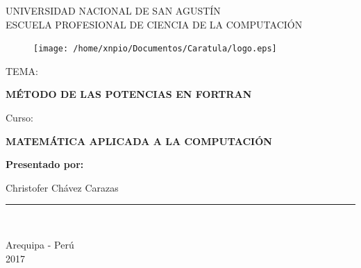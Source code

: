 \documentclass[a4paper,12pt]{article}
\begin{document}
\begin{titlepage}

\begin{center}
\vspace*{-1in}

\begin{large}
UNIVERSIDAD NACIONAL DE SAN AGUSTÍN\\
\vspace*{0.15in}
ESCUELA PROFESIONAL DE CIENCIA DE LA COMPUTACIÓN\\
\end{large}
\begin{figure}[htb]
\centering
\texttt{[image: /home/xnpio/Documentos/Caratula/logo.eps]}
\end{figure}
\vspace*{0.15in}
\begin{large}
TEMA:\\
\end{large}
\vspace*{0.2in}
\begin{Large}
\textbf{MÉTODO DE LAS POTENCIAS EN FORTRAN} \\
\end{Large}
\vspace{8mm}

\begin{large}
Curso:\\
\end{large}
\vspace*{0.2in}
\begin{Large}
\textbf{MATEMÁTICA APLICADA A LA COMPUTACIÓN} \\
\end{Large}

\vspace{8mm}

\begin{large}
\textbf{Presentado por:}\\

\begin{flushleft}

\hspace{7cm} Christofer Chávez Carazas \\

\end{flushleft}
\end{large}
\vspace{4cm}
\rule{80mm}{0.1mm}\\
\vspace*{0.1in}

\begin{large}
Arequipa - Perú \\
2017 \\
\end{large}
\end{center}
\end{titlepage}
\end{document}
